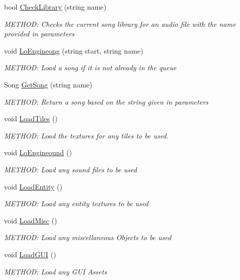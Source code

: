 \begin{DoxyCompactItemize}
bool \hyperlink{a00530_a939824a1d16e96b4322225a18f7a47d6}{Check\+Library} (string name)
\begin{DoxyCompactList}\small\item\em M\+E\+T\+H\+OD\+: Checks the current song library for an audio file with the name provided in parameters \end{DoxyCompactList}\item 
void \hyperlink{a00530_aa8ac4f03379c9dd95e96ca38b6da344b}{Lo\+Engineong} (string start, string name)
\begin{DoxyCompactList}\small\item\em M\+E\+T\+H\+OD\+: Load a song if it is not already in the queue \end{DoxyCompactList}\item 
Song \hyperlink{a00530_a6587452c5637a132330fb0e2f6dc4e7a}{Get\+Song} (string name)
\begin{DoxyCompactList}\small\item\em M\+E\+T\+H\+OD\+: Return a song based on the string given in parameters \end{DoxyCompactList}\item 
void \hyperlink{a00530_a3c054651a1f23dd6a968336f2079f1b2}{Load\+Tiles} ()
\begin{DoxyCompactList}\small\item\em M\+E\+T\+H\+OD\+: Load the textures for any tiles to be used. \end{DoxyCompactList}\item 
void \hyperlink{a00530_a557cc78880f9acf324eb77d9be245c98}{Lo\+Engineound} ()
\begin{DoxyCompactList}\small\item\em M\+E\+T\+H\+OD\+: Load any sound files to be used \end{DoxyCompactList}\item 
void \hyperlink{a00530_a8ed087cf44b8c303edb0d8b59efb3a9b}{Load\+Entity} ()
\begin{DoxyCompactList}\small\item\em M\+E\+T\+H\+OD\+: Load any entity textures to be used \end{DoxyCompactList}\item 
void \hyperlink{a00530_a19d917cb5f5580c6c4a4fa00c3f63daa}{Load\+Misc} ()
\begin{DoxyCompactList}\small\item\em M\+E\+T\+H\+OD\+: Load any miscellaneous Objects to be used \end{DoxyCompactList}\item 
void \hyperlink{a00530_ab4c5158cd1df0416f5abdc9d82eccf9f}{Load\+G\+UI} ()
\begin{DoxyCompactList}\small\item\em M\+E\+T\+H\+OD\+: Load any G\+UI Assets \end{DoxyCompactList}\end{DoxyCompactItemize}
